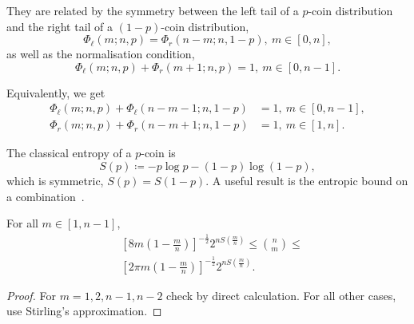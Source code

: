 \documentclass[pra,
aps,
twocolumn,
superscriptaddress,
groupedaddress,
nofootinbib,
reprint
]{revtex4-1}
\begin{document}
They are related by the symmetry between the left tail of a $p$-coin distribution and the right tail of a $(1-p)$-coin distribution,
\begin{equation}\label{eq:phil2phir}
	\Phi_\ell(m; n, p) = \Phi_r(n-m; n, 1-p),\ m\in [0,n],
\end{equation}
as well as the normalisation condition,
\begin{equation}
	\Phi_\ell(m; n, p) + \Phi_r(m+1; n, p) = 1,\ m\in [0,n-1].
\end{equation}

Equivalently, we get
\begin{align}
	\Phi_\ell(m; n, p) + \Phi_\ell(n-m-1; n, 1-p) &= 1,\ m\in [0,n-1], \label{eq:reversephi}\\
	\Phi_r(m; n, p) + \Phi_r(n-m+1; n, 1-p) &= 1,\ m\in [1,n]. \label{eq:reversephir}
\end{align}

The classical entropy of a $p$-coin is
\begin{equation}\label{eq:ent}
	S(p) \coloneqq -p\log{p} -(1-p)\log{(1-p)},
\end{equation}
which is symmetric, $S(p) = S(1-p)$.
A useful result is the entropic bound on a combination~\cite{cit:ash}.
\begin{lemma}\label{lem:comb_bounds}
	For all $m\in [1,n-1]$,
	\begin{align}
		&\left[ 8m\left(1-\frac{m}{n}\right) \right]^{-\frac{1}{2}} 2^{nS\left(\frac{m}{n}\right)} \leq \binom{n}{m} \leq \\
		&\left[ 2\pi m\left(1-\frac{m}{n}\right) \right]^{-\frac{1}{2}} 2^{nS\left(\frac{m}{n}\right)}.
	\end{align}
\end{lemma}
\begin{proof}
	For $m = 1,2, n-1, n-2$ check by direct calculation.	
	For all other cases, use Stirling's approximation.
\end{proof}
\end{document}
